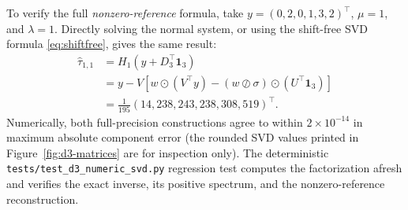 To verify the full \emph{nonzero-reference} formula,
take $y=(0,2,0,1,3,2)^\top$, $\mu=1$, and
$\lambda=1$. Directly solving the normal system,
or using the shift-free SVD formula
\eqref{eq:shiftfree}, gives the same result:
\begin{equation}\label{eq:d3-nonzero-affine-check}
\begin{aligned}
\widehat\tau_{1,1}
&=H_1(y+D_3^\top\mathbf1_3)\\
&=y-V\!\left[
w\odot(V^\top y)-(w\oslash\sigma)
\odot(U^\top\mathbf1_3)\right]\\
&=\frac1{195}
(14,238,243,238,308,519)^\top.
\end{aligned}
\end{equation}
Numerically, both full-precision constructions
agree to within $2\times10^{-14}$ in maximum
absolute component error (the rounded SVD values
printed in Figure~\ref{fig:d3-matrices} are for
inspection only). The deterministic
\texttt{tests/test\_d3\_numeric\_svd.py} regression
test computes the factorization afresh and verifies
the exact inverse, its positive spectrum,
and the nonzero-reference reconstruction.
